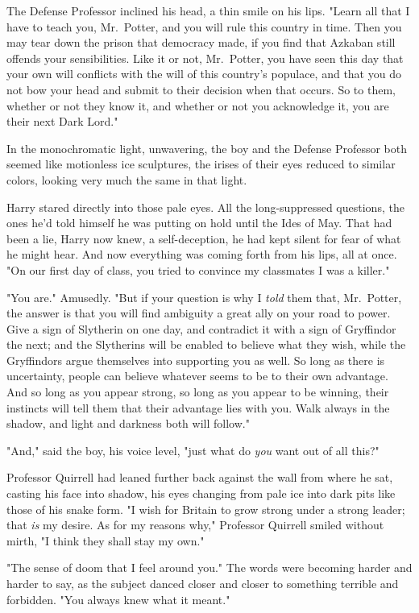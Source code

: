 The Defense Professor inclined his head, a thin smile on his lips. "Learn all
that I have to teach you, Mr.~Potter, and you will rule this country in time.
Then you may tear down the prison that democracy made, if you find that Azkaban
still offends your sensibilities. Like it or not, Mr.~Potter, you have seen
this day that your own will conflicts with the will of this country's populace,
and that you do not bow your head and submit to their decision when that
occurs. So to them, whether or not they know it, and whether or not you
acknowledge it, you are their next Dark Lord."

In the monochromatic light, unwavering, the boy and the Defense Professor both
seemed like motionless ice sculptures, the irises of their eyes reduced to
similar colors, looking very much the same in that light.

Harry stared directly into those pale eyes. All the long-suppressed questions,
the ones he'd told himself he was putting on hold until the Ides of May. That
had been a lie, Harry now knew, a self-deception, he had kept silent for fear
of what he might hear. And now everything was coming forth from his lips, all
at once. "On our first day of class, you tried to convince my classmates I was
a killer."

"You are." Amusedly. "But if your question is why I \emph{told} them that,
Mr.~Potter, the answer is that you will find ambiguity a great ally on your
road to power. Give a sign of Slytherin on one day, and contradict it with a
sign of Gryffindor the next; and the Slytherins will be enabled to believe what
they wish, while the Gryffindors argue themselves into supporting you as well.
So long as there is uncertainty, people can believe whatever seems to be to
their own advantage. And so long as you appear strong, so long as you appear to
be winning, their instincts will tell them that their advantage lies with you.
Walk always in the shadow, and light and darkness both will follow."

"And," said the boy, his voice level, "just what do \emph{you} want out of all
this?"

Professor Quirrell had leaned further back against the wall from where he sat,
casting his face into shadow, his eyes changing from pale ice into dark pits
like those of his snake form. "I wish for Britain to grow strong under a strong
leader; that \emph{is} my desire. As for my reasons why," Professor Quirrell
smiled without mirth, "I think they shall stay my own."

"The sense of doom that I feel around you." The words were becoming harder and
harder to say, as the subject danced closer and closer to something terrible
and forbidden. "You always knew what it meant."

